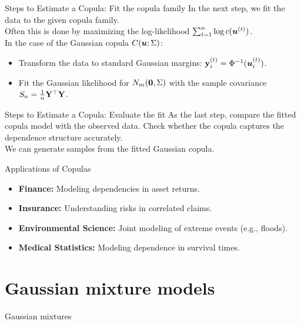 \documentclass[11pt,handout,aspectratio=169]{beamer}
\begin{document}
\begin{frame}{Steps to Estimate a Copula: Fit the copula family}
In the next step, we fit the data to the given copula family. \\[3mm]

Often this is done by maximizing the log-likelihood $\sum_{t=1}^n \log c(\boldsymbol u^{(t)})$.\\[3mm]

In the case of the Gaussian copula $C(\boldsymbol u;\Sigma)$:
\begin{itemize}
	\item Transform the data to standard Gaussian margins: $\mathbf{y}^{(t)}_i=\Phi^{-1}(\boldsymbol u^{(t)}_i)$.
	\item Fit the Gaussian likelihood for $N_m(\boldsymbol 0,\Sigma)$ with the sample covariance  $S_n=\tfrac1n \mathbf{Y}^\top \mathbf{Y}$.
\end{itemize}
\end{frame}


\begin{frame}{Steps to Estimate a Copula: Evaluate the fit}
As the last step, compare the fitted copula model with the observed data. Check whether the copula captures the dependence structure accurately.\\[3mm]
We can generate samples from the fitted Gaussian copula.
\end{frame}




\begin{frame}{Applications of Copulas}
\begin{itemize}
    \item \textbf{Finance:} Modeling dependencies in asset returns.
    \item \textbf{Insurance:} Understanding risks in correlated claims.
    \item \textbf{Environmental Science:} Joint modeling of extreme events (e.g., floods).
    \item \textbf{Medical Statistics:} Modeling dependence in survival times.
\end{itemize}
\end{frame}


\section{Gaussian mixture models}

\begin{frame}{}
	\begin{center}
		{\Huge \alert{Gaussian mixtures}}
	\end{center}
\end{frame}
\end{document}
